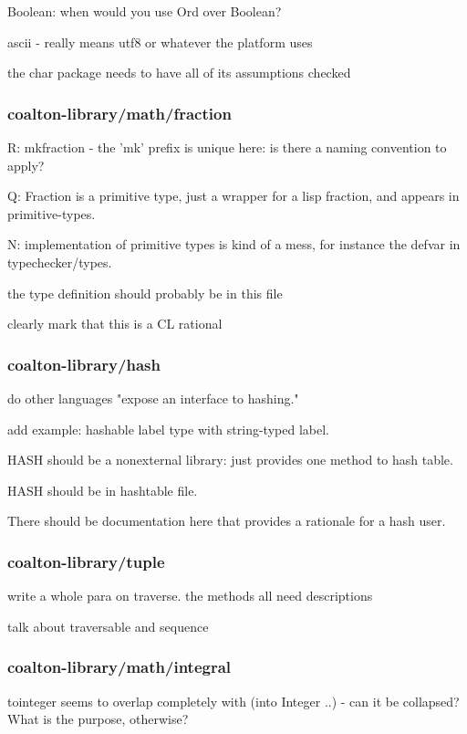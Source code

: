 \documentclass[12pt]{article}
\begin{document}
Boolean: when would you use Ord over Boolean?

ascii - really means utf8 or whatever the platform uses

the char package needs to have all of its assumptions checked

\subsubsection{coalton-library/math/fraction}

R: mkfraction - the 'mk' prefix is unique here: is there a naming convention to apply?

Q: Fraction is a primitive type, just a wrapper for a lisp fraction, and appears in primitive-types.

N: implementation of primitive types is kind of a mess, for instance
the defvar in typechecker/types.

the type definition should probably be in this file

clearly mark that this is a CL rational

\subsubsection{coalton-library/hash}

do other languages "expose an interface to hashing."

add example: hashable label type with string-typed label.

HASH should be a nonexternal library: just provides one method to hash table.

HASH should be in hashtable file.

There should be documentation here that provides a rationale for a hash user.

\subsubsection{coalton-library/tuple}

write a whole para on traverse. the methods all need descriptions

talk about traversable and sequence

\subsubsection{coalton-library/math/integral}

tointeger seems to overlap completely with (into Integer ..)
- can it be collapsed? What is the purpose, otherwise?
\end{document}
